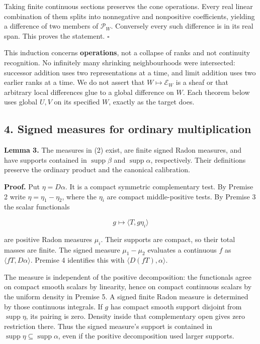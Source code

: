 \documentclass[
  11pt,
]{article}
\begin{document}
Taking finite continuous sections preserves the cone operations. Every
real linear combination of them splits into nonnegative and nonpositive
coefficients, yielding a difference of two members of \(\mathcal P_W\).
Conversely every such difference is in its real span. This proves the
statement. \(\square\)

This induction concerns \textbf{operations}, not a collapse of ranks and
not continuity recognition. No infinitely many shrinking neighbourhoods
were intersected: successor addition uses two representations at a time,
and limit addition uses two earlier ranks at a time. We do not assert
that \(W\mapsto\mathcal E_W\) is a sheaf or that arbitrary local
differences glue to a global difference on \(W\). Each theorem below
uses global \(U,V\) on its specified \(W\), exactly as the target does.

\subsection{4. Signed measures for ordinary
multiplication}\label{signed-measures-for-ordinary-multiplication}

\textbf{Lemma 3.} The measures in (2) exist, are finite signed Radon
measures, and have supports contained in \(\operatorname{supp}\beta\)
and \(\operatorname{supp}\alpha\), respectively. Their definitions
preserve the ordinary product and the canonical calibration.

\textbf{Proof.} Put \(\eta=D\alpha\). It is a compact symmetric
complementary test. By Premise 2 write \(\eta=\eta_1-\eta_2\), where the
\(\eta_i\) are compact middle-positive tests. By Premise 3 the scalar
functionals

\[g\longmapsto\langle T,g\eta_i\rangle\]

are positive Radon measures \(\mu_i\). Their supports are compact, so
their total masses are finite. The signed measure \(\mu_1-\mu_2\)
evaluates a continuous \(f\) as \(\langle fT,D\alpha\rangle\). Premise 4
identifies this with \(\langle D(fT),\alpha\rangle\).

The measure is independent of the positive decomposition: the
functionals agree on compact smooth scalars by linearity, hence on
compact continuous scalars by the uniform density in Premise 5. A signed
finite Radon measure is determined by those continuous integrals. If
\(g\) has compact smooth support disjoint from
\(\operatorname{supp}\eta\), its pairing is zero. Density inside that
complementary open gives zero restriction there. Thus the signed
measure's support is contained in
\(\operatorname{supp}\eta\subseteq\operatorname{supp}\alpha\), even if
the positive decomposition used larger supports.
\end{document}

